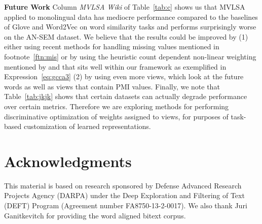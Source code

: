 \documentclass[11pt]{article}
\begin{document}
\noindent\textbf{Future Work} Column \emph{MVLSA Wiki} of
Table~\ref{tab:c} shows us that MVLSA applied to monolingual data has
 mediocre performance  compared to the baselines of Glove and
Word2Vec on word similarity tasks and performs surprisingly worse on
the AN-SEM dataset. We believe that the results could be improved by (1)
either using recent methods for handling missing values
mentioned in footnote~\ref{ftn:mis} or by using the heuristic count dependent
non-linear weighting mentioned by 
and that sits well within our framework as exemplified in Expression~\ref{eq:gcca3}
 (2) by using even more views, which
look at the future words as well as views that contain PMI values. 
Finally, we note that Table~\ref{tab:jkjk} shows that certain datasets can
actually degrade performance over certain metrics. Therefore we are
exploring methods for performing discriminative optimization of weights
assigned to views, for purposes of task-based customization of learned representations.


\section*{Acknowledgments}
This material is based on research sponsored by Defense Advanced Research
Projects Agency (DARPA) under the Deep Exploration and
Filtering of Text (DEFT) Program (Agreement number
FA8750-13-2-0017). We also thank Juri Ganitkevitch for 
providing the word aligned bitext corpus.



\end{document}
